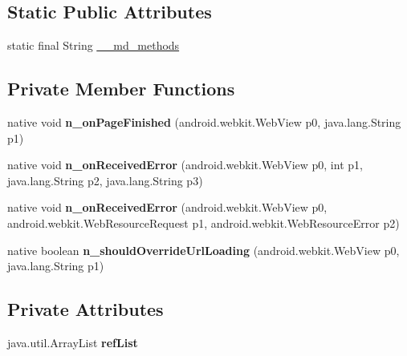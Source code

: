 \subsection*{Static Public Attributes}
\begin{DoxyCompactItemize}
\item 
static final String \hyperlink{classmd5b60ffeb829f638581ab2bb9b1a7f4f3f_1_1WebViewRenderer__WebClient_ab15ec026f7472a54d028a56570e44543}{\+\_\+\+\_\+md\+\_\+methods}
\end{DoxyCompactItemize}
\subsection*{Private Member Functions}
\begin{DoxyCompactItemize}
\item 
\mbox{\label{classmd5b60ffeb829f638581ab2bb9b1a7f4f3f_1_1WebViewRenderer__WebClient_a99db1c826929c2ed0f92fe4226fca37d}} 
native void {\bfseries n\+\_\+on\+Page\+Finished} (android.\+webkit.\+Web\+View p0, java.\+lang.\+String p1)
\item 
\mbox{\label{classmd5b60ffeb829f638581ab2bb9b1a7f4f3f_1_1WebViewRenderer__WebClient_ad79d7a4337743489ebd3c346104f6159}} 
native void {\bfseries n\+\_\+on\+Received\+Error} (android.\+webkit.\+Web\+View p0, int p1, java.\+lang.\+String p2, java.\+lang.\+String p3)
\item 
\mbox{\label{classmd5b60ffeb829f638581ab2bb9b1a7f4f3f_1_1WebViewRenderer__WebClient_a1d651253b298787466e21c00db593573}} 
native void {\bfseries n\+\_\+on\+Received\+Error} (android.\+webkit.\+Web\+View p0, android.\+webkit.\+Web\+Resource\+Request p1, android.\+webkit.\+Web\+Resource\+Error p2)
\item 
\mbox{\label{classmd5b60ffeb829f638581ab2bb9b1a7f4f3f_1_1WebViewRenderer__WebClient_ae3e3c0ff01ff214273e665e88e187735}} 
native boolean {\bfseries n\+\_\+should\+Override\+Url\+Loading} (android.\+webkit.\+Web\+View p0, java.\+lang.\+String p1)
\end{DoxyCompactItemize}
\subsection*{Private Attributes}
\begin{DoxyCompactItemize}
\item 
\mbox{\label{classmd5b60ffeb829f638581ab2bb9b1a7f4f3f_1_1WebViewRenderer__WebClient_a71f15194255a9d336085332b3a20da84}} 
java.\+util.\+Array\+List {\bfseries ref\+List}
\end{DoxyCompactItemize}


